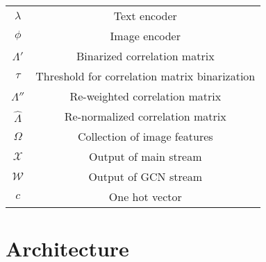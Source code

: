 \documentclass[10pt,twocolumn,letterpaper]{article}
\begin{document}
\begin{table}[H]
\begin{adjustbox}{width=0.45\textwidth}
\begin{tabular}{cc}
        $\lambda$ & Text encoder \\
        $\phi$ & Image encoder \\
        $\Lambda'$ & Binarized correlation matrix \\
        $\tau$ & Threshold for correlation matrix binarization \\
        $\Lambda''$ & Re-weighted correlation matrix \\
        $\hat{\Lambda}$ & Re-normalized correlation matrix \\
        $\Omega$ & Collection of image features \\
        $\mathcal{X}$ & Output of main stream \\
        $\mathcal{W}$ & Output of GCN stream \\
        $c$ & One hot vector \\
        \bottomrule
    \end{tabular}
    \end{adjustbox}
    \label{tab:notation}
\end{table}

\section{Architecture}
\end{document}
